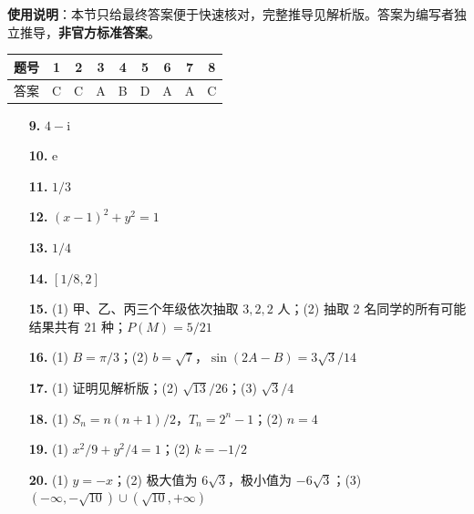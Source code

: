 
\begin{gknotice}
\textbf{使用说明}：本节只给最终答案便于快速核对，完整推导见解析版。答案为编写者独立推导，\textbf{非官方标准答案}。
\end{gknotice}

\begin{center}\begin{tabular}{ccccccccc}
\toprule
题号 & 1 & 2 & 3 & 4 & 5 & 6 & 7 & 8 \\
\midrule
答案 & C & C & A & B & D & A & A & C \\
\bottomrule
\end{tabular}\end{center}

\begin{itemize}[leftmargin=2.6em]
  \item[\textbf{9.}] $4-\mathrm i$
  \item[\textbf{10.}] $\mathrm e$
  \item[\textbf{11.}] $1/3$
  \item[\textbf{12.}] $(x-1)^2+y^2=1$
  \item[\textbf{13.}] $1/4$
  \item[\textbf{14.}] $[1/8,2]$
\end{itemize}

\begin{itemize}[leftmargin=2.6em]
  \item[\textbf{15.}] (1) 甲、乙、丙三个年级依次抽取 $3,2,2$ 人；(2) 抽取 2 名同学的所有可能结果共有 21 种；$P(M)=5/21$
  \item[\textbf{16.}] (1) $B=\pi/3$；(2) $b=\sqrt7$，$\sin(2A-B)=3\sqrt3/14$
  \item[\textbf{17.}] (1) 证明见解析版；(2) $\sqrt{13}/26$；(3) $\sqrt3/4$
  \item[\textbf{18.}] (1) $S_n=n(n+1)/2$，$T_n=2^n-1$；(2) $n=4$
  \item[\textbf{19.}] (1) $x^2/9+y^2/4=1$；(2) $k=-1/2$
  \item[\textbf{20.}] (1) $y=-x$；(2) 极大值为 $6\sqrt3$，极小值为 $-6\sqrt3$；(3) $(-\infty,-\sqrt{10})\cup(\sqrt{10},+\infty)$
\end{itemize}
